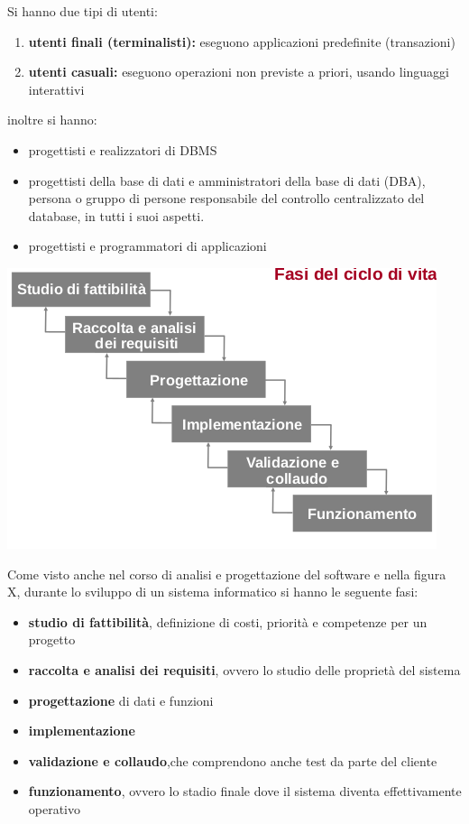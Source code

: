 \documentclass[a4paper,12pt, oneside]{book}
\begin{document}
Si hanno due tipi di utenti:
\begin{enumerate}
	\item \textbf{utenti finali (terminalisti):} eseguono applicazioni predefinite (transazioni)
	\item \textbf{utenti casuali:} eseguono operazioni non previste a priori, usando linguaggi interattivi
\end{enumerate}
inoltre si hanno:
\begin{itemize}
	\item progettisti e realizzatori di DBMS
	\item progettisti della base di dati e amministratori della base di dati (DBA),
	      persona o gruppo di persone responsabile del controllo centralizzato del database,
	      in tutti i suoi aspetti.
	\item progettisti e programmatori di applicazioni
\end{itemize}
\begin{center}
	\includegraphics[scale=0.8]{img/bas.png}
\end{center}
Come visto anche nel corso di analisi e progettazione del software e nella figura X,
durante lo sviluppo di un sistema informatico si hanno le seguente fasi:
\begin{itemize}
	\item \textbf{studio di fattibilità}, definizione di costi, priorità e competenze per un progetto
	\item\textbf{raccolta e analisi dei requisiti}, ovvero lo studio delle proprietà del sistema
	\item \textbf{progettazione} di dati e funzioni
	\item \textbf{implementazione}
	\item \textbf{validazione e collaudo},che comprendono anche test da parte del cliente
	\item \textbf{funzionamento}, ovvero lo stadio finale dove il sistema diventa effettivamente operativo
\end{itemize}
\end{document}
